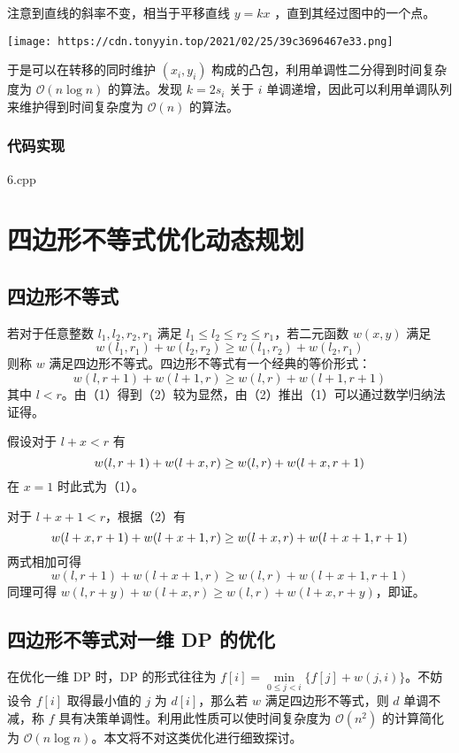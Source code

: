 注意到直线的斜率不变，相当于平移直线 \(y=kx\) ，直到其经过图中的一个点。

\texttt{[image: https://cdn.tonyyin.top/2021/02/25/39c3696467e33.png]}

于是可以在转移的同时维护 \((x_i,y_i)\)
构成的凸包，利用单调性二分得到时间复杂度为 \(\mathcal{O}(n\log n)\)
的算法。发现 \(k=2s_i\) 关于 \(i\)
单调递增，因此可以利用单调队列来维护得到时间复杂度为 \(\mathcal{O}(n)\)
的算法。

\subsubsection{代码实现}

6.cpp

\section{四边形不等式优化动态规划}

\subsection{四边形不等式}

若对于任意整数 \(l_1,l_2,r_2,r_1\) 满足
\(l_1\le l_2\le r_2\le r_1\)，若二元函数 \(w(x,y)\) 满足 \[
w(l_1,r_1)+w(l_2,r_2)\ge w(l_1,r_2)+w(l_2,r_1)\tag{1}
\] 则称 \(w\) 满足四边形不等式。四边形不等式有一个经典的等价形式： \[
w(l,r+1)+w(l+1,r)\ge w(l,r)+w(l+1,r+1)\tag{2}
\] 其中
\(l\lt r\)。由（1）得到（2）较为显然，由（2）推出（1）可以通过数学归纳法证得。

假设对于 \(l+x\lt r\) 有 \[
w(l,r+1)+w(l+x,r)\ge w(l,r)+w(l+x,r+1)\\
\] 在 \(x=1\) 时此式为（1）。

对于 \(l+x+1\lt r\)，根据（2）有 \[
w(l+x,r+1)+w(l+x+1,r)\ge w(l+x,r)+w(l+x+1,r+1)\\
\] 两式相加可得 \[
w(l,r+1)+w(l+x+1,r)\ge w(l,r)+w(l+x+1,r+1)
\] 同理可得 \(w(l,r+y)+w(l+x,r)\ge w(l,r)+w(l+x,r+y)\)，即证。

\subsection{四边形不等式对一维 DP 的优化}

在优化一维 DP 时，DP 的形式往往为
\(f[i]=\min\limits_{0\le j\lt i}\{f[j]+w(j,i)\}\)。不妨设令 \(f[i]\)
取得最小值的 \(j\) 为 \(d[i]\)，那么若 \(w\) 满足四边形不等式，则 \(d\)
单调不减，称 \(f\) 具有决策单调性。利用此性质可以使时间复杂度为
\(\mathcal{O}(n^2)\) 的计算简化为
\(\mathcal{O}(n\log n)\)。本文将不对这类优化进行细致探讨。

